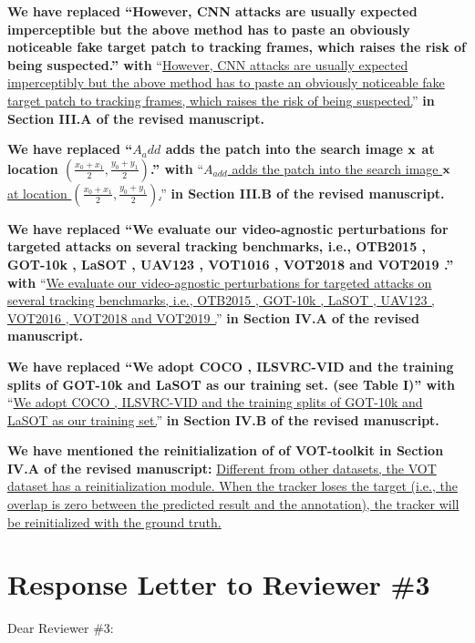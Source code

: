 \documentclass[12pt]{article}
\begin{document}
\textbf{We have replaced ``However, CNN attacks are usually expected imperceptible but the above method has to paste an obviously noticeable fake target patch to tracking frames, which raises the risk of being suspected.'' with}
``\uline{However, CNN attacks are usually expected imperceptibly but the above method has to paste an obviously noticeable fake target patch to tracking frames, which raises the risk of being suspected.}''
\textbf{in Section III.A of the revised manuscript.}

\textbf{We have  replaced ``$A_add$ adds the patch into the search image $\textbf x$ at location $(\frac{x_0+x_1}{2},\frac{y_0+y_1}{2})$.'' with}
``\uline{$A_{add}$ adds the patch into the search image $\textbf x$ at location $(\frac{x_0+x_1}{2},\frac{y_0+y_1}{2})$.}''
\textbf{in Section III.B of the revised manuscript.}

\textbf{We have replaced ``We evaluate our video-agnostic perturbations for targeted attacks on several tracking benchmarks, i.e., OTB2015 \cite{OTB}, GOT-10k \cite{GOT-10k}, LaSOT \cite{LaSOT}, UAV123 \cite{UAV123}, VOT1016 \cite{VOT2016}, VOT2018 \cite{VOT2018} and VOT2019 \cite{VOT2019}.'' with}
``\uline{We evaluate our video-agnostic perturbations for targeted attacks on several tracking benchmarks, i.e., OTB2015 \cite{OTB}, GOT-10k \cite{GOT-10k}, LaSOT \cite{LaSOT}, UAV123 \cite{UAV123}, VOT2016 \cite{VOT2016}, VOT2018 \cite{VOT2018} and VOT2019 \cite{VOT2019}.}''
\textbf{in Section IV.A of the revised manuscript.}

\textbf{We have replaced ``We adopt COCO \cite{COCO}, ILSVRC-VID \cite{VID} and the training splits of GOT-10k \cite{GOT-10k} and LaSOT \cite{LaSOT} as our training set. (see Table I)'' with}
``\uline{We adopt COCO \cite{COCO}, ILSVRC-VID \cite{VID} and the training splits of GOT-10k \cite{GOT-10k} and LaSOT \cite{LaSOT} as our training set.}''
\textbf{in Section IV.B of the revised manuscript.}

\textbf{We have mentioned the reinitialization of of VOT-toolkit in Section IV.A of the revised manuscript:}
\uline{Different from other datasets, the VOT dataset has a reinitialization module. When the tracker loses the target (i.e., the overlap is zero between the predicted result and the annotation), the tracker will be reinitialized with the ground truth.}

\clearpage
\newpage
{\centering\section*{Response Letter to Reviewer \#3}}
\noindent Dear Reviewer \#3:
\end{document}
